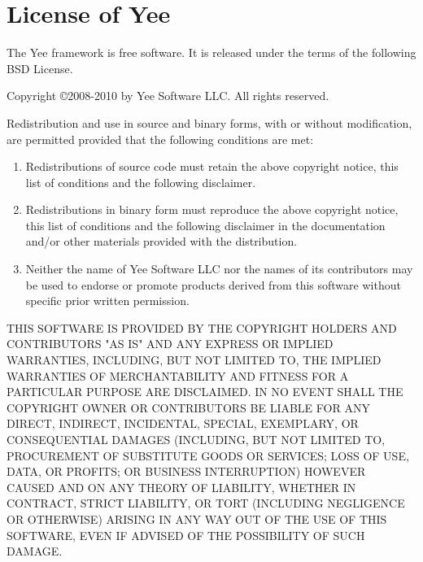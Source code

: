 \chapter*{License of Yee}

The Yee framework is free software.
It is released under the terms of the following BSD License.

Copyright \copyright 2008-2010 by Yee Software LLC.
All rights reserved.

Redistribution and use in source and binary forms, with or without
modification, are permitted provided that the following conditions
are met:
\begin{enumerate}
\item Redistributions of source code must retain the above copyright
      notice, this list of conditions and the following disclaimer.
\item Redistributions in binary form must reproduce the above
      copyright notice, this list of conditions and the following
      disclaimer in the documentation and/or other materials provided
	  with the distribution.
\item Neither the name of Yee Software LLC nor the names of its
      contributors may be used to endorse or promote products derived
	  from this software without specific prior written permission.
\end{enumerate}

{\footnotesize
THIS SOFTWARE IS PROVIDED BY THE COPYRIGHT HOLDERS AND CONTRIBUTORS "AS IS"
AND ANY EXPRESS OR IMPLIED WARRANTIES, INCLUDING, BUT NOT LIMITED TO, THE
IMPLIED WARRANTIES OF MERCHANTABILITY AND FITNESS FOR A PARTICULAR PURPOSE
ARE DISCLAIMED. IN NO EVENT SHALL THE COPYRIGHT OWNER OR CONTRIBUTORS BE
LIABLE FOR ANY DIRECT, INDIRECT, INCIDENTAL, SPECIAL, EXEMPLARY, OR
CONSEQUENTIAL DAMAGES (INCLUDING, BUT NOT LIMITED TO, PROCUREMENT OF
SUBSTITUTE GOODS OR SERVICES; LOSS OF USE, DATA, OR PROFITS; OR BUSINESS
INTERRUPTION) HOWEVER CAUSED AND ON ANY THEORY OF LIABILITY, WHETHER IN
CONTRACT, STRICT LIABILITY, OR TORT (INCLUDING NEGLIGENCE OR OTHERWISE)
ARISING IN ANY WAY OUT OF THE USE OF THIS SOFTWARE, EVEN IF ADVISED OF THE
POSSIBILITY OF SUCH DAMAGE.
}